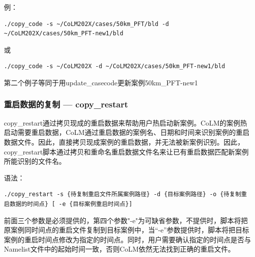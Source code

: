 例：
\begin{lstlisting}[xleftmargin=2.5em]
./copy_code -s ~/CoLM202X/cases/50km_PFT/bld -d ~/CoLM202X/cases/50km_PFT-new1/bld
\end{lstlisting}
或
\begin{lstlisting}[xleftmargin=2.5em]
./copy_code -s ~/CoLM202X -d ~/CoLM202X/cases/50km_PFT-new1/bld
\end{lstlisting}
第二个例子等同于用update\_casecode更新案例50km\_PFT-new1

\subsubsection{重启数据的复制 --- copy\_restart}
copy\_restart通过拷贝现成的重启数据来帮助用户热启动新案例。CoLM的案例热启动需要重启数据，CoLM通过重启数据的案例名、日期和时间来识别案例的重启数据文件。因此，直接拷贝现成案例的重启数据，并无法被新案例识别。因此，copy\_restart脚本通过拷贝和重命名重启数据文件名来让已有重启数据匹配新案例所能识别的文件名。

语法：
\begin{lstlisting}[xleftmargin=2.5em]
./copy_restart -s {待复制重启文件所属案例路径} -d {目标案例路径} -o {待复制重启数据的时间点} [ -e {目标案例重启时间点}]
\end{lstlisting}

前面三个参数是必须提供的，第四个参数"-e"为可缺省参数，不提供时，脚本将把原案例同时间点的重启文件复制到目标案例中，当“-e”参数提供时，脚本将把目标案例的重启时间点修改为指定的时间点。同时，用户需要确认指定的时间点是否与Namelist文件中的起始时间一致，否则CoLM依然无法找到正确的重启文件。
